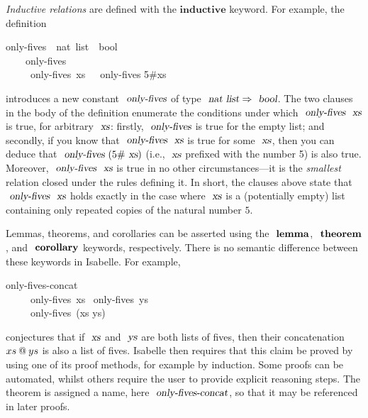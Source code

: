 \emph{Inductive relations} are defined with the $\mathbf{inductive}$ keyword.
For example, the definition
\begin{isabelle}
 only-fives\ {\isacharcolon}{\isacharcolon}\ {\isachardoublequoteopen}nat\ list\ {\isasymRightarrow}\ bool{\isachardoublequoteclose}\  \\
~~~~{\isachardoublequoteopen}only-fives\ {\isacharbrackleft}{\isacharbrackright}{\isachardoublequoteclose}\ {\isacharbar}\\
~~~~{\isachardoublequoteopen}{\isasymlbrakk}\ only-fives\ xs\ {\isasymrbrakk}\ {\isasymLongrightarrow}\ only-fives {\isacharparenleft}5\#xs{\isacharparenright}{\isachardoublequoteclose}
\end{isabelle}
\noindent %
introduces a new constant $\isa{only-fives}$ of type $\isa{nat list} \Rightarrow \isa{bool}$.
The two clauses in the body of the definition enumerate the conditions under which $\isa{only-fives}\ \isa{xs}$ is true, for arbitrary $\isa{xs}$: firstly, $\isa{only-fives}$ is true for the empty list; and secondly, if you know that $\isa{only-fives}\ \isa{xs}$ is true for some $\isa{xs}$, then you can deduce that $\isa{only-fives}\ (5\#\isa{xs})$ (i.e., $\isa{xs}$ prefixed with the number 5) is also true.
Moreover, $\isa{only-fives}\ \isa{xs}$ is true in no other circumstances---it is the \emph{smallest} relation closed under the rules defining it.
In short, the clauses above state that $\isa{only-fives}\ \isa{xs}$ holds exactly in the case where $\isa{xs}$ is a (potentially empty) list containing only repeated copies of the natural number $5$.

Lemmas, theorems, and corollaries can be asserted using the $\isacommand{lemma}$, $\isacommand{theorem}$, and $\isacommand{corollary}$ keywords, respectively.
There is no semantic difference between these keywords in Isabelle.
For example,
\begin{isabelle}
 only-fives-concat{\isacharcolon} \\
~~~~\ only-fives\ xs \ only-fives\ ys\\
~~~~\ only-fives\ (xs \isacharat ys)
\end{isabelle}
\noindent %
conjectures that if $\isa{xs}$ and $\isa{ys}$ are both lists of fives, then their concatenation $xs \mathbin{\emph{$@$}} ys$ is also a list of fives.
Isabelle then requires that this claim be proved by using one of its proof methods, for example by induction.
Some proofs can be automated, whilst others require the user to provide explicit reasoning steps.
The theorem is assigned a name, here $\isa{only-fives-concat}$, so that it may be referenced in later proofs.

